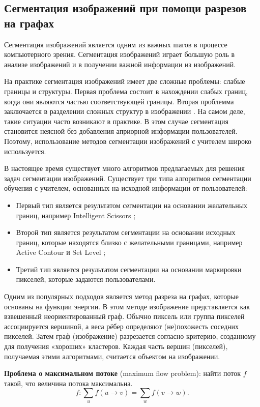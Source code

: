 \subsection{Сегментация изображений при помощи разрезов на графах}
Сегментация изображений является одним из важных шагов в процессе компьютерного зрения. Сегментация изображений играет большую роль в анализе изображений и в получении важной информации из изображений.

На практике сегментация изображений имеет две сложные проблемы: слабые границы и структуры. Первая проблема состоит в нахождении слабых границ, когда они являются частью соответствующей границы. Вторая проблемма заключается в разделении сложных структур в изображении \cite{Sagiv2006, Raviv2007}. На самом деле, такие ситуации часто возникают в практике. В этом случае сегментация становится неясной без добавления априорной информации пользователей. Поэтому, использование методов сегментации изображений с учителем широко используется.

В настоящее время существует много алгоритмов предлагаемых для решения задач сегментации изображений. Существует три типа алгоритмов сегментации обучения с учителем, основанных на исходной информации от пользователей:

\begin{itemize}
	\item Первый тип является результатом сегментации на основании желательных границ, например Intelligent Scissors \cite{Mortensen1995};
	\item Второй тип является  результатом сегментации на основании исходных границ, которые находятся близко с желательными границами, например Active Contour \cite{Lankton} и Set Level \cite{Lie2006};
	\item Третий тип является результатом сегментации на основании маркировки пикселей, которые задаются пользователами.
\end{itemize}
Одним из популярных подходов является метод разреза на графах, которые основаны на функции энергии. В этом методе изображение представляется как взвешенный неориентированный граф. Обычно пиксель или группа пикселей ассоциируется вершиной, а веса рёбер определяют (не)похожесть соседних пикселей. Затем граф (изображение) разрезается согласно критерию, созданному для получения «хороших» кластеров. Каждая часть вершин (пикселей), получаемая этими алгоритмами, считается объектом на изображении.

\textbf{Проблема о максимальном потоке} (maximum flow problem): найти поток $f$ такой, что величина потока максимальна. 
\[
f: \sum_u f\left(u\rightarrow v\right)=\sum_wf\left(v\rightarrow w\right). 
\]

